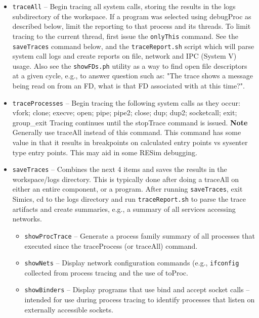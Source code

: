 \documentclass[titlepage]{article}
\begin{document}
\begin{itemize}
\item {\tt traceAll} – Begin tracing all system calls, storing the results in the logs subdirectory of the workspace.  
If a program was selected using debugProc as described below, limit the reporting to that process and its threads.  
To limit tracing to the current thread, first issue the {\tt onlyThis} command.
See the {\tt saveTraces} command below, and the {\tt traceReport.sh} script which will parse system call logs and create reports on file, network and IPC (System V) usage.
Also see the {\tt showFDs.ph} utility as a way to find open file descriptors at a given cycle, e.g., to answer question such as: "The trace shows a message being read
on from an FD, what is that FD associated with at this time?".

\item {\tt traceProcesses} – Begin tracing the following system calls as they occur:
vfork; clone; execve;  open; pipe; pipe2; close; dup; dup2; socketcall; exit; group\_exit
Tracing continues until the stopTrace command is issued.  
\textbf{Note} Generally use traceAll instead of this command.  This command has some value in that it results in breakpoints on calculated entry points vs
sysenter type entry points.  This may aid in some RESim debugging.

\item {\tt saveTraces} -- Combines the next 4 items and saves the results in the workspace/logs directory.  This is typically done after doing a traceAll
on either an entire component, or a program.  After running {\tt saveTraces}, exit Simics, cd to the logs directory and run {\tt traceReport.sh} to parse
the trace artifacts and create summaries, e.g., a summary of all services accessing networks.
\begin{itemize}
\item {\tt showProcTrace} – Generate a process family summary of all processes that executed since the traceProcess (or traceAll) command.

\item {\tt showNets} – Display network configuration commands (e.g., {\tt ifconfig} collected from process tracing and the use of toProc.

\item {\tt showBinders} – Display programs that use bind and accept socket calls – intended for use during process tracing to identify processes that listen on externally accessible sockets.


\end{itemize}
\end{itemize}
\end{document}

